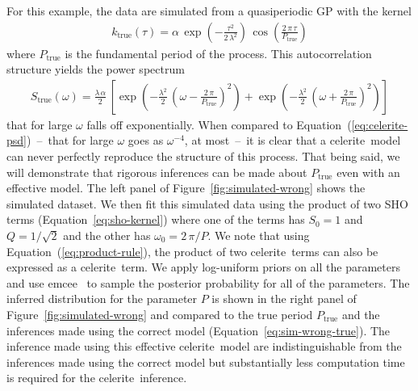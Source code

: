 \documentclass[manuscript, letterpaper]{aastex6}
\newcommand{\project}[1]{\textsf{#1}}
\newcommand{\celerite}{\project{celerite}}
\newcommand{\emcee}{\project{emcee}}
\newcommand{\figureref}[1]{\ref{fig:#1}}
\newcommand{\Figure}[1]{Figure~\figureref{#1}}
\renewcommand{\eqref}[1]{\ref{eq:#1}}
\newcommand{\Eq}[1]{Equation~(\eqref{#1})}
\newcommand{\eq}[1]{\Eq{#1}}
\newcommand{\eqalt}[1]{Equation~\eqref{#1}}
\newcommand{\eqlabel}[1]{\label{eq:#1}}
\begin{document}
For this example, the data are simulated from a quasiperiodic GP with the
kernel
\begin{eqnarray}\eqlabel{sim-wrong-true}
k_\mathrm{true} (\tau) = \alpha\,
    \exp\left(-\frac{\tau^2}{2\,\lambda^2}\right)\,
    \cos\left(\frac{2\,\pi\,\tau}{P_\mathrm{true}}\right)
\end{eqnarray}
where $P_\mathrm{true}$ is the fundamental period of the process.
This autocorrelation structure yields the power spectrum
\begin{eqnarray}
S_\mathrm{true} (\omega) = \frac{\lambda\,\alpha}{2}\,\left[
    \exp\left(-\frac{\lambda^2}{2}\,\left(\omega-
        \frac{2\,\pi}{P_\mathrm{true}}\right)^2\right) +
    \exp\left(-\frac{\lambda^2}{2}\,\left(\omega+
        \frac{2\,\pi}{P_\mathrm{true}}\right)^2\right)
\right]
\end{eqnarray}
that for large $\omega$ falls off exponentially.
When compared to \eq{celerite-psd}~--~that for large $\omega$ goes as
$\omega^{-4}$, at most~--~it is clear that a \celerite\ model can never
perfectly reproduce the structure of this process.
That being said, we will demonstrate that rigorous inferences can be made
about $P_\mathrm{true}$ even with an effective model.
The left panel of \Figure{simulated-wrong} shows the simulated dataset.
We then fit this simulated data using the product of two SHO terms
(\eqalt{sho-kernel}) where one of the terms has $S_0 = 1$ and $Q =
1/\sqrt{2}$ and the other has $\omega_0 = 2\,\pi/P$.
We note that using \eq{product-rule}, the product of two \celerite\ terms can
also be expressed as a \celerite\ term.
We apply log-uniform priors on all the parameters and use \emcee\
\citep{Foreman-Mackey:2013} to sample the posterior probability for all of the
parameters.
The inferred distribution for the parameter $P$ is shown in the right panel of
\Figure{simulated-wrong} and compared to the true period $P_\mathrm{true}$ and
the inferences made using the correct model (\eqalt{sim-wrong-true}).
The inference made using this effective \celerite\ model are indistinguishable
from the inferences made using the correct model but substantially less
computation time is required for the \celerite\ inference.
\end{document}
